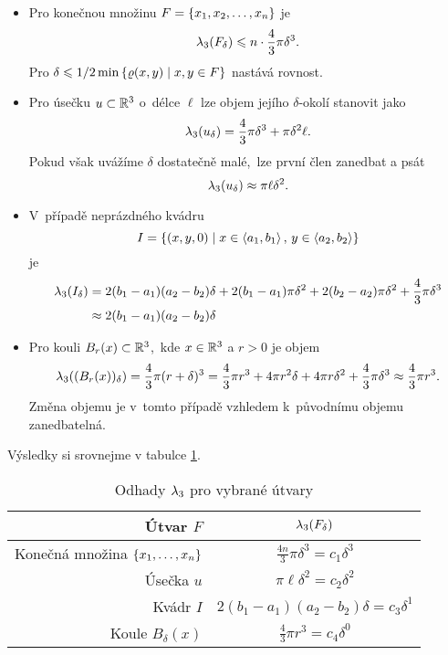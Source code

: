 \begin{itemize}
    \item Pro konečnou množinu $F=\left\{x_1,x_2,\ldots,x_n\right\}$ je
    \[\lambda_3(F_\delta)\leqslant n\cdot\dfrac{4}{3}\pi\delta^3.\]
    Pro $\delta\leqslant1/2\min\left\{\varrho(x,y)\mid x,y\in F\right\}$ nastává rovnost.
    \item Pro úsečku $u\subset\mathbb{R}^3$ o~délce $\ell$ lze objem jejího $\delta$-okolí stanovit jako
    \[\lambda_3(u_\delta)=\dfrac{4}{3}\pi \delta^3+\pi\delta^2\ell.\]
    Pokud však uvážíme $\delta$ dostatečně malé,~lze první člen zanedbat a psát
    \[\lambda_3(u_\delta)\approx\pi\ell\delta^2.\]
    \item V~případě neprázdného kvádru
    \[I=\left\{(x,y,0)\mid x\in\langle a_1,b_1\rangle\,,\,y\in\langle a_2,b_2\rangle\right\}\]
    je
    \begin{align*}
        \lambda_3(I_\delta)&=2(b_1-a_1)(a_2-b_2)\delta+2(b_1-a_1)\pi\delta^2+2(b_2-a_2)\pi\delta^2+\dfrac{4}{3}\pi\delta^3\\
        &\approx 2(b_1-a_1)(a_2-b_2)\delta
    \end{align*}
    \item Pro kouli $B_r(x)\subset\mathbb{R}^3$,~kde $x\in\mathbb{R}^3$ a $r>0$ je objem
    \[\lambda_3((B_r(x))_\delta)=\dfrac{4}{3}\pi (r+\delta)^3=\dfrac{4}{3}\pi r^3+4\pi r^2\delta+4\pi r\delta^2+\dfrac{4}{3}\pi\delta^3\approx\dfrac{4}{3}\pi r^3.\]
    Změna objemu je v~tomto případě vzhledem k~původnímu objemu zanedbatelná.
\end{itemize}
Výsledky si srovnejme v tabulce \ref{table:odhady-lambda_3}.
\begin{table}[h]
    \centering
    \begin{tabular}{r|c}
    Útvar $F$                               & $\lambda_3(F_\delta)$       \\\hline
    Konečná množina $\left\{x_1,\ldots,x_n\right\}$ & $\frac{4n}{3}\pi\delta^3=c_1\delta^3$   \\
    Úsečka $u$                             & $\pi\ell\delta^2=c_2\delta^2$           \\
    Kvádr $I$                              & $2(b_1-a_1)(a_2-b_2)\delta=c_3\delta^1$ \\
    Koule $B_\delta(x)$                    & $\frac{4}{3}\pi r^3=c_4\delta^0$      
    \end{tabular}
    \caption{Odhady $\lambda_3$ pro vybrané útvary}
    \label{table:odhady-lambda_3}
\end{table}

